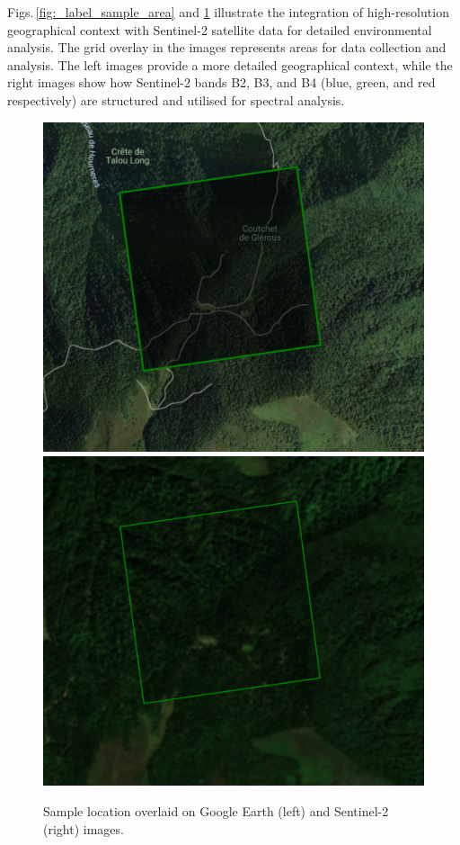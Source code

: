Figs.\,\ref{fig:_label_sample_area} and \ref{fig:label_sample} illustrate the integration of 
high-resolution geographical context with Sentinel-2 satellite data for detailed environmental analysis. 
The grid overlay in the images represents areas for data collection and analysis. 
The left images provide a more detailed geographical context, while the right images show
how Sentinel-2 bands B2, B3, and B4 (blue, green, and red respectively) are structured
 and utilised for spectral analysis.

\begin{figure}[!thb]
    \centering

    \includegraphics[width=0.48\linewidth]{figures/figures_sentinel/sample_earth.png}
    \includegraphics[width=0.48\linewidth]{figures/figures_sentinel/sample_sentinel.png}

    \caption{Sample location overlaid on Google Earth (left) and Sentinel-2 (right) images.}
    \label{fig:label_sample}
\end{figure}